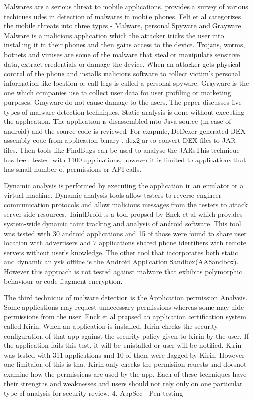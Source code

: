 \documentclass{mproj}
\begin{document}
Malwares are a serious threat to mobile applications. \cite{chandramohan2012} provides a survey of various techiques udes in detection of malwares in mobile phones. Felt et al \cite{felt2011} categorizes the mobile threats into three types - Malware, personal Spyware and Grayware. Malware is a malicious application which the attacker tricks the user into installing it in their phones and then gains access to the device. Trojans, worms, botnets and viruses are some of the malware that steal or manipulate sensitive data, extract credentials or damage the device. When an attacker gets physical control of the phone and installs malicious software to collect victim's personal information like location or call logs is called a personal spyware. Grayware is the one which companies use to collect user data for user profiling or marketing purposes. Grayware do not cause damage to the users. The paper \cite{chandramohan2011} discusses five types of malware detection techniques. Static analysis is done without executing the application. The application is disassembled into Java source (in case of android) and the source code is reviewed.  For exapmle, DeDexer generated DEX assembly code from application binary , dex2jar to convert DEX files to JAR files. Then tools like FindBugs can be used to analyse the JARsThis technique has been tested with 1100 applications, however it is limited to applications that has small number of permissions or API calls. 

Dynamic analysis is performed by executing the application in an emulator or a virtual machine.  Dynamic analysis tools allow testers to reverse engineer communication protocols and allow malicious messages from the testers to attack server side resources.  TaintDroid is a tool propsed by Enck et al\cite{enck2014} which provides system-wide dynamic taint tracking and analysis of android software. This tool was tested with 30 android applications and 15 of those were found to share user location with advertisers and 7 applications shared phone identifiers with remote servers without user's knowledge. The other tool that incorporates both static and dynamic anlysis offline is the Android Application Sandbox(AASandbox)\cite{blasing2010}. However this approach is not tested against malware that exhibits polymorphic behaviour or code fragment encryption. 

The third technique of malware detection is the Application permission Analysis. Some applications may request unnecessary permissions whereas some may hide permissions from the user. Enck et al \cite{enck2009lightweight} propsed an application certification system called Kirin. When an application is installed, Kirin checks the security configuration of that app against the security policy given to Kirin by the user.  If the application fails this test, it will be unistalled or user will be notified. Kirin was tested with 311 applications and 10 of them were flagged by Kirin. However one limitaion of this is that Kirin only checks the permisiion reuests and doesnot examine how the permissions are used by the app. Each of these techniques have their strengths and weaknesses and users should not rely only on one particular type of analysis for security review. 
4. AppSec - Pen testing
\end{document}
